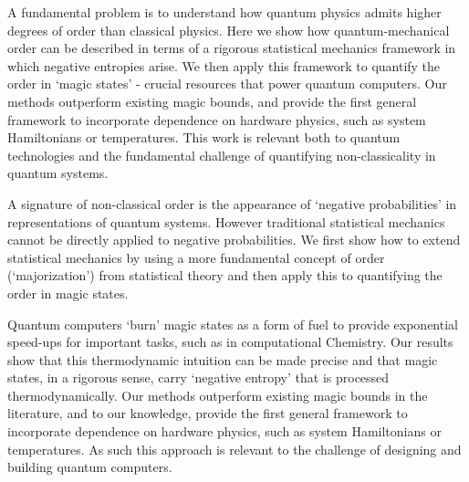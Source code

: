 \documentclass[11pt]{letter}
\begin{document}
A fundamental problem is to understand how quantum physics admits higher degrees of order than classical physics. Here we show how quantum-mechanical order can be described in terms of a rigorous statistical mechanics framework in which negative entropies arise. We then apply this framework to quantify the order in `magic states' - crucial resources that power quantum computers. Our methods outperform existing magic bounds, and provide the first general framework to incorporate dependence on hardware physics, such as system Hamiltonians or temperatures. This work is relevant both to quantum technologies and the fundamental challenge of quantifying non-classicality in quantum systems.

A signature of non-classical order is the appearance of `negative probabilities' in representations of quantum systems. However traditional statistical mechanics cannot be directly applied to negative probabilities. We first show how to extend statistical mechanics by using a more fundamental concept of order (`majorization') from statistical theory and then apply this to quantifying the order in magic states.

Quantum computers `burn' magic states as a form of fuel to provide exponential speed-ups for important tasks, such as in computational Chemistry. Our results show that this thermodynamic intuition can be made precise and that magic states, in a rigorous sense, carry `negative entropy' that is processed thermodynamically. Our methods outperform existing magic bounds in the literature, and to our knowledge, provide the first general framework to incorporate dependence on hardware physics, such as system Hamiltonians or temperatures. As such this approach is relevant to the challenge of designing and building quantum computers.
\end{document}
